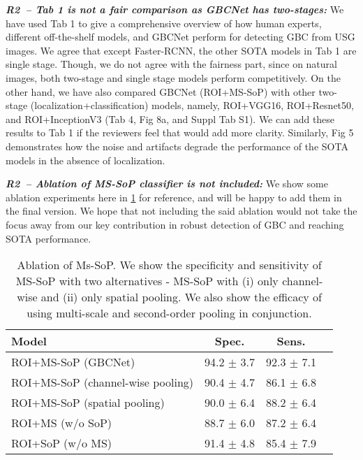 \documentclass[10pt,twocolumn,letterpaper]{article}
\newcommand{\rb}{\textcolor{PineGreen}{R2}}
\newcommand{\myfirstpara}[1]{\noindent \textbf{\textit{#1:}}}
\newcommand{\mypara}[1]{\vspace{0.1em} \myfirstpara{#1}}
\begin{document}

\mypara{\rb ~-- Tab 1 is not a fair comparison as GBCNet has two-stages}
%
We have used Tab 1 to give a comprehensive overview of how human experts, different off-the-shelf models, and GBCNet perform for detecting GBC from USG images. We agree that except Faster-RCNN, the other SOTA models in Tab 1 are single stage. Though, we do not agree with the fairness part, since on natural images, both two-stage and single stage models perform competitively. On the other hand, we have also compared GBCNet (ROI+MS-SoP) with other two-stage (localization+classification) models, namely, ROI+VGG16, ROI+Resnet50, and ROI+InceptionV3 (Tab 4, Fig 8a, and Suppl Tab S1). We can add these results to Tab 1 if the reviewers feel that would add more clarity. Similarly, Fig 5 demonstrates how the noise and artifacts degrade the performance of the SOTA models in the absence of localization.  

\mypara{\rb ~-- Ablation of MS-SoP classifier is not included}
%
We show some ablation experiments here in  \cref{tbl:ms-sop-ablation} for reference, and will be happy to add them in the final version. We hope that not including the said ablation would not take the focus away from our key contribution in robust detection of GBC and reaching SOTA performance. 

\begin{table}[t]
	\centering
	\footnotesize
    \begin{tabular}{@{}lccc@{}}
    \toprule[1pt]
    \textbf{Model} & \textbf{Spec.} & \textbf{Sens.} \\
    \midrule[0.5pt]
    ROI+MS-SoP (GBCNet) & 94.2 $\pm$ 3.7 & 92.3 $\pm$ 7.1 \\
    ROI+MS-SoP (channel-wise pooling) & 90.4 $\pm$ 4.7 & 86.1 $\pm$ 6.8  \\
    ROI+MS-SoP (spatial pooling) & 90.0 $\pm$ 6.4 & 88.2 $\pm$ 6.4 \\
    ROI+MS (w/o SoP) & 88.7 $\pm$ 6.0 & 87.2 $\pm$ 6.4 \\
    ROI+SoP (w/o MS) & 91.4 $\pm$ 4.8 & 85.4 $\pm$ 7.9 \\
    \bottomrule[1pt]
    \end{tabular}
	\caption{Ablation of Ms-SoP. We show the specificity and sensitivity of MS-SoP with two alternatives - MS-SoP with (i) only channel-wise and (ii) only spatial pooling. We also show the efficacy of using multi-scale and second-order pooling in conjunction.}
\label{tbl:ms-sop-ablation}
\end{table}
\end{document}
